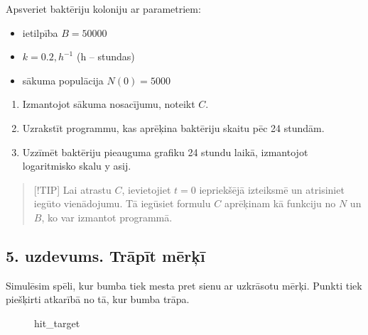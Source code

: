 Apsveriet baktēriju koloniju ar parametriem:

\begin{itemize}
\item
  ietilpība \(B = 50000\)
\item
  \(k = 0.2 , h^{-1}\) (h -- stundas)
\item
  sākuma populācija \(N(0) = 5000\)
\end{itemize}

\begin{enumerate}
\def\labelenumi{\alph{enumi})}
\item
  Izmantojot sākuma nosacījumu, noteikt \(C\).
\item
  Uzrakstīt programmu, kas aprēķina baktēriju skaitu pēc 24 stundām.
\item
  Uzzīmēt baktēriju pieauguma grafiku 24 stundu laikā, izmantojot
  logaritmisko skalu y asij.
\end{enumerate}

\begin{quote}
{[}!TIP{]} Lai atrastu \(C\), ievietojiet \(t = 0\) iepriekšējā
izteiksmē un atrisiniet iegūto vienādojumu. Tā iegūsiet formulu \(C\)
aprēķinam kā funkciju no \(N\) un \(B\), ko var izmantot programmā.
\end{quote}

\subsection{5. uzdevums. Trāpīt
mērķī}\label{uzdevums.-trux101pux12bt-mux113rux137ux12b}

Simulēsim spēli, kur bumba tiek mesta pret sienu ar uzkrāsotu mērķi.
Punkti tiek piešķirti atkarībā no tā, kur bumba trāpa.

\begin{figure}
\centering
{}
\caption{hit\_target}
\end{figure}

